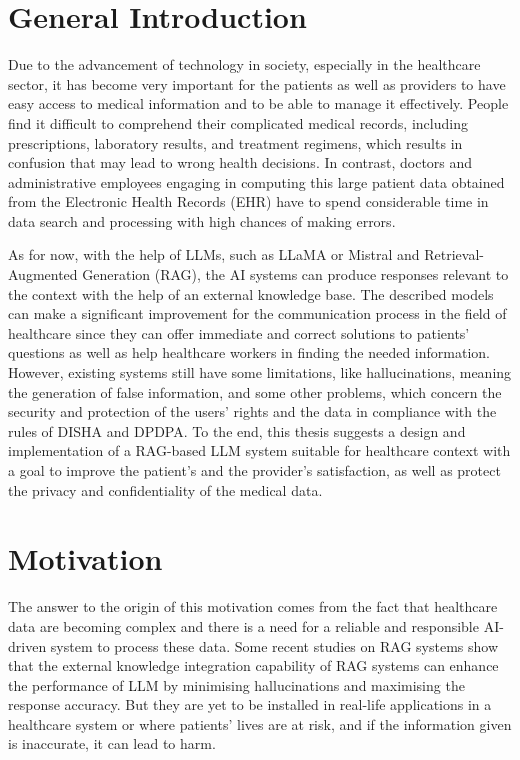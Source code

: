 \section{General Introduction}
Due to the advancement of technology in society, especially in the healthcare sector, it has become very important for the patients as well as providers to have easy access to medical information and to be able to manage it effectively. People find it difficult to comprehend their complicated medical records, including prescriptions, laboratory results, and treatment regimens, which results in confusion that may lead to wrong health decisions. In contrast, doctors and administrative employees engaging in computing this large patient data obtained from the Electronic Health Records (EHR) have to spend considerable time in data search and processing with high chances of making errors.

As for now, with the help of LLMs, such as LLaMA or Mistral and Retrieval-Augmented Generation (RAG), the AI systems can produce responses relevant to the context with the help of an external knowledge base. The described models can make a significant improvement for the communication process in the field of healthcare since they can offer immediate and correct solutions to patients' questions as well as help healthcare workers in finding the needed information. However, existing systems still have some limitations, like hallucinations, meaning the generation of false information, and some other problems, which concern the security and protection of the users' rights and the data in compliance with the rules of DISHA\cite{Ganapathy} and DPDPA\cite{SundaraNarendran+2023+129+141}. To the end, this thesis suggests a design and implementation of a RAG-based LLM system suitable for healthcare context with a goal to improve the patient's and the provider's satisfaction, as well as protect the privacy and confidentiality of the medical data.

\newpage

\section{Motivation}
\indent The answer to the origin of this motivation comes from the fact that healthcare data are becoming complex and there is a need for a reliable and responsible AI-driven system to process these data. Some recent studies on RAG systems show that the external knowledge integration capability of RAG systems can enhance the performance of LLM by minimising hallucinations and maximising the response accuracy. But they are yet to be installed in real-life applications in a healthcare system or where patients' lives are at risk, and if the information given is inaccurate, it can lead to harm.


